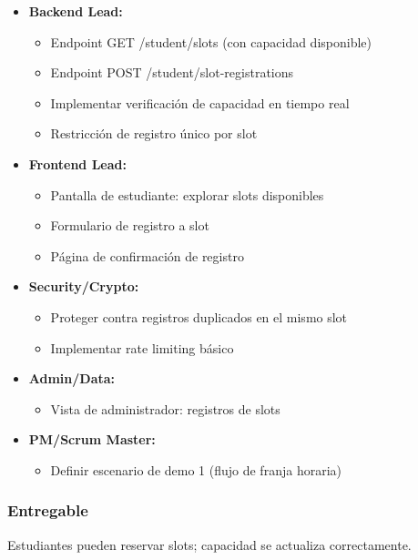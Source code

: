 \documentclass[12pt,a4paper]{article}
\begin{document}
\begin{itemize}[leftmargin=*]
    \item \textbf{Backend Lead:}
    \begin{itemize}
        \item Endpoint GET /student/slots (con capacidad disponible)
        \item Endpoint POST /student/slot-registrations
        \item Implementar verificación de capacidad en tiempo real
        \item Restricción de registro único por slot
    \end{itemize}
    
    \item \textbf{Frontend Lead:}
    \begin{itemize}
        \item Pantalla de estudiante: explorar slots disponibles
        \item Formulario de registro a slot
        \item Página de confirmación de registro
    \end{itemize}
    
    \item \textbf{Security/Crypto:}
    \begin{itemize}
        \item Proteger contra registros duplicados en el mismo slot
        \item Implementar rate limiting básico
    \end{itemize}
    
    \item \textbf{Admin/Data:}
    \begin{itemize}
        \item Vista de administrador: registros de slots
    \end{itemize}
    
    \item \textbf{PM/Scrum Master:}
    \begin{itemize}
        \item Definir escenario de demo 1 (flujo de franja horaria)
    \end{itemize}
\end{itemize}

\subsubsection{Entregable}
Estudiantes pueden reservar slots; capacidad se actualiza correctamente.
\end{document}
